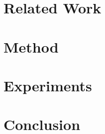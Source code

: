 \documentclass[letterpaper, 10pt, conference]{ieeeconf}
\begin{document}
\section{Related Work}\label{sec:related}


\section{Method}\label{sec:method}


\section{Experiments}\label{sec:experiments}


\section{Conclusion}\label{sec:conclusion}




\end{document}

